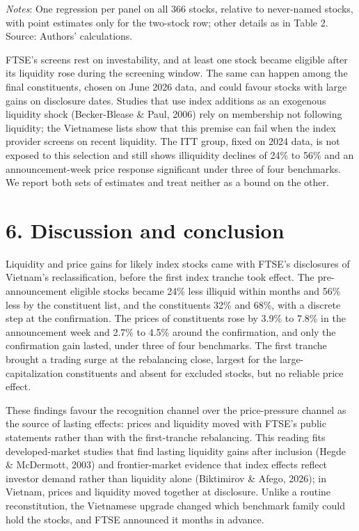 \documentclass[review,authoryear,12pt]{elsarticle}
\begin{document}
\emph{Notes}: One regression per panel on all 366 stocks, relative to
never-named stocks, with point estimates only for the two-stock row;
other details as in Table 2. Source: Authors' calculations.

FTSE's screens rest on investability, and at least one stock became
eligible after its liquidity rose during the screening window. The same
can happen among the final constituents, chosen on June 2026 data, and
could favour stocks with large gains on disclosure dates. Studies that
use index additions as an exogenous liquidity shock (Becker-Blease \&
Paul, 2006) rely on membership not following liquidity; the Vietnamese
lists show that this premise can fail when the index provider screens on
recent liquidity. The ITT group, fixed on 2024 data, is not exposed to
this selection and still shows illiquidity declines of 24\% to 56\% and
an announcement-week price response significant under three of four
benchmarks. We report both sets of estimates and treat neither as a
bound on the other.

\hypertarget{discussion-and-conclusion}{%
\section*{6. Discussion and conclusion}}

Liquidity and price gains for likely index stocks came with FTSE's
disclosures of Vietnam's reclassification, before the first index
tranche took effect. The pre-announcement eligible stocks became 24\%
less illiquid within months and 56\% less by the constituent list, and
the constituents 32\% and 68\%, with a discrete step at the
confirmation. The prices of constituents rose by 3.9\% to 7.8\% in the
announcement week and 2.7\% to 4.5\% around the confirmation, and only
the confirmation gain lasted, under three of four benchmarks. The first
tranche brought a trading surge at the rebalancing close, largest for
the large-capitalization constituents and absent for excluded stocks,
but no reliable price effect.

These findings favour the recognition channel over the price-pressure
channel as the source of lasting effects: prices and liquidity moved
with FTSE's public statements rather than with the first-tranche
rebalancing. This reading fits developed-market studies that find
lasting liquidity gains after inclusion (Hegde \& McDermott, 2003) and
frontier-market evidence that index effects reflect investor demand
rather than liquidity alone (Biktimirov \& Afego, 2026); in Vietnam,
prices and liquidity moved together at disclosure. Unlike a routine
reconstitution, the Vietnamese upgrade changed which benchmark family
could hold the stocks, and FTSE announced it months in advance.
\end{document}
